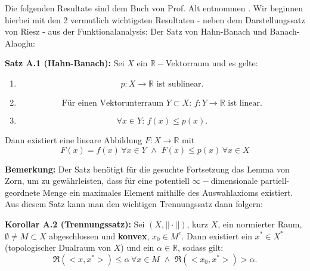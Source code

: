\documentclass[
	language=german, %
	type=seminar, %
]{isthesis}
\begin{document}
    \setcounter{page}{\numexpr\value{savepage}}

    
    
\begin{appendix}
Die folgenden Resultate sind dem Buch von Prof. Alt entnommen \cite{FunkAnaAlt}. Wir beginnen hierbei mit den 2 vermutlich wichtigsten Resultaten - neben dem Darstellungssatz von Riesz - aus der Funktionalanalysis: Der Satz von Hahn-Banach und Banach-Alaoglu:\\ 
\colorbox{theored}{\begin{minipage}{16cm}{\textcolor{black}{}}
\textbf{Satz A.1 (Hahn-Banach):} Sei \(X\) ein \(\mathbb{R}-\)Vektorraum und es gelte:
\begin{enumerate}
    \item \begin{equation}
        p:X \to \mathbb{R} \text{ ist sublinear}.
    \end{equation}
    \item \begin{equation}
        \text{Für einen Vektorunterraum } Y \subset X:\,f:Y \to \mathbb{R} \text{ ist linear}.
    \end{equation}
    \item \begin{equation}
        \forall x \in Y:\,f(x) \le p(x).
    \end{equation}
\end{enumerate}
Dann existiert eine lineare Abbildung \(F:X \to \mathbb{R}\) mit
\begin{equation}
    F(x)=f(x)\,\forall x \in Y\,\,\land\,\, F(x) \le p(x)\,\forall x \in X
\end{equation}
\end{minipage}}
     
\textbf{Bemerkung:} Der Satz benötigt für die gesuchte Fortsetzung das Lemma von Zorn, um zu gewährleisten, dass für eine potentiell \(\infty-\)dimensionale partiell-geordnete Menge ein maximales Element mithilfe des Auswahlaxioms existiert.\\

Aus diesem Satz kann man den wichtigen Trennungssatz dann folgern:\\
\colorbox{theored}{\begin{minipage}{16cm}{\textcolor{black}{}}
\textbf{Korollar A.2 (Trennungssatz):} Sei \((X,||\cdot||)\), kurz \(X\), ein normierter Raum, \(\emptyset \neq M \subset X\) abgeschlossen und \textbf{konvex}, \(x_0 \in M^c\). Dann existiert ein \(x^* \in X^*\) (topologischer Dualraum von \(X\)) und ein \(\alpha \in \mathbb{R}\), sodass gilt:
\begin{equation}
    \Re (<x,x^*>) \le \alpha \,\forall x \in M \,\,\land\,\, \Re (<x_0,x^*>) > \alpha.
\end{equation}
\end{minipage}}


\end{appendix}
\end{document}
